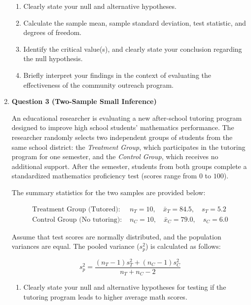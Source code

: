 \documentclass{article}
\begin{document}
\begin{enumerate}
\begin{enumerate}[label=(\alph*)]

\item Clearly state your null and alternative hypotheses.

\item Calculate the sample mean, sample standard deviation, test statistic, and degrees of freedom.

\item Identify the critical value(s), and clearly state your conclusion regarding the null hypothesis.

\item Briefly interpret your findings in the context of evaluating the effectiveness of the community outreach program.

\end{enumerate}

    \item \textbf{Question 3 (Two-Sample Small Inference)}

An educational researcher is evaluating a new after-school tutoring program designed to improve high school students' mathematics performance. The researcher randomly selects two independent groups of students from the same school district: the \textit{Treatment Group}, which participates in the tutoring program for one semester, and the \textit{Control Group}, which receives no additional support. After the semester, students from both groups complete a standardized mathematics proficiency test (scores range from $0$ to $100$).

The summary statistics for the two samples are provided below:

\[
\begin{aligned}
\text{Treatment Group (Tutored): } & n_T = 10,\quad \bar{x}_T = 84.5,\quad s_T = 5.2 \\
\text{Control Group (No tutoring): } & n_C = 10,\quad \bar{x}_C = 79.0,\quad s_C = 6.0
\end{aligned}
\]

Assume that test scores are normally distributed, and the population variances are equal. The pooled variance ($s_p^2$) is calculated as follows:

\[
s_p^2 = \frac{(n_T - 1)s_T^2 + (n_C - 1)s_C^2}{n_T + n_C - 2}
\]

\begin{enumerate}[label=(\alph*)]

\item Clearly state your null and alternative hypotheses for testing if the tutoring program leads to higher average math scores.


\end{enumerate}
\end{enumerate}
\end{document}
